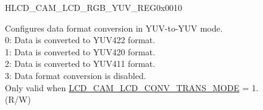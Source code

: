 \begin{register}{H}{LCD\_CAM\_LCD\_RGB\_YUV\_REG}{0x0010}
\begin{regdesc}
\begin{reglist}
\label{fielddesc:LCDCAMLCDCONVYUV2YUVMODE}\item [LCD\_CAM\_LCD\_CONV\_YUV2YUV\_MODE]Configures data format conversion in YUV-to-YUV mode.\\
0: Data is converted to YUV422 format.\\
1: Data is converted to YUV420 format.\\
2: Data is converted to YUV411 format. \\
3: Data format conversion is disabled.\\
Only valid when \hyperref[fielddesc:LCDCAMLCDCONVTRANSMODE]{LCD\_CAM\_LCD\_CONV\_TRANS\_MODE} = 1. \\
(R/W)

\item [Continued on the next page...]
\end{reglist}\end{regdesc}
\end{register}

